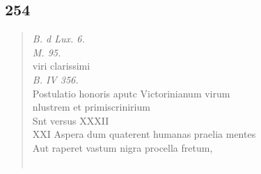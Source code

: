 \documentclass[11pt, a4paper]{report}
\begin{document}
            \subsection*{254}
      \begin{verse}
      \textit{B. d Lux. 6.} \\ \textit{M. 95.} \\ viri clarissimi \\ \textit{B. IV 356.} \\ Postulatio honoris aputc Victorinianum virum \\ nlustrem et primiscrinirium \\ Snt versus XXXII \\  \lbrack XXI \rbrack  Aspera dum quaterent humanas praelia mentes \\ Aut raperet vastum nigra procella fretum, \\ 
        ﻿\pagebreak 

\end{verse}
\end{document}
